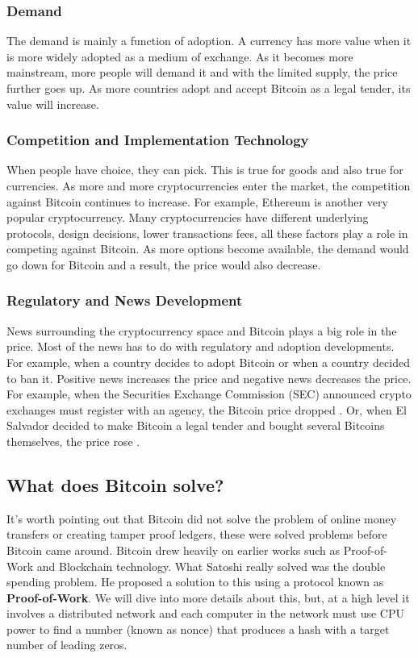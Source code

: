\documentclass[11pt]{article} %
\begin{document}
\subsubsection{Demand}{}
The demand is mainly a function of adoption. A currency has more value when it is more widely adopted as a medium of exchange. As it becomes more mainstream, more people will demand it and with the limited supply, the price further goes up. As more countries adopt and accept Bitcoin as a legal tender, its value will increase.

\subsubsection{Competition and Implementation Technology}{}
When people have choice, they can pick. This is true for goods and also true for currencies. As more and more cryptocurrencies enter the market, the competition against Bitcoin continues to increase. For example, Ethereum is another very popular cryptocurrency. Many cryptocurrencies have different underlying protocols, design decisions, lower transactions fees, all these factors play a role in competing against Bitcoin. As more options become available, the demand would go down for Bitcoin and a result, the price would also decrease.

\subsubsection{Regulatory and News Development}{}
News surrounding the cryptocurrency space and Bitcoin plays a big role in the price. Most of the news has to do with regulatory and adoption developments. For example, when a country decides to adopt Bitcoin or when a country decided to ban it. Positive news increases the price and negative news decreases the price. For example, when the Securities Exchange Commission (SEC) announced crypto exchanges must register with an agency, the Bitcoin price dropped \cite{6}. Or, when El Salvador decided to make Bitcoin a legal tender and bought several Bitcoins themselves, the price rose \cite{5}.

\subsection{What does Bitcoin solve?}{}
It's worth pointing out that Bitcoin did not solve the problem of online money transfers or creating tamper proof ledgers, these were solved problems before Bitcoin came around. Bitcoin drew heavily on earlier works such as Proof-of-Work and Blockchain technology. What Satoshi really solved was the double spending problem. He proposed a solution to this using a protocol known as \textbf{Proof-of-Work}. We will dive into more details about this, but, at a high level it involves a distributed network and each computer in the network must use CPU power to find a number (known as nonce) that produces a hash with a target number of leading zeros.
\end{document}

